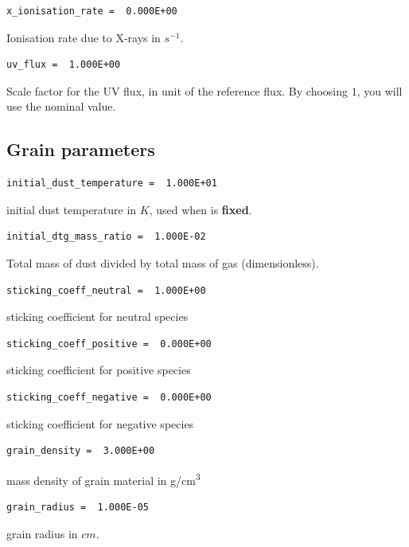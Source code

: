 \documentclass[english,a4paper,twoside]{article}
\begin{document}
\begin{verbatim}
x_ionisation_rate =  0.000E+00
\end{verbatim}
Ionisation rate due to X-rays in $\unit{s^{-1}}$.

\begin{verbatim}
uv_flux =  1.000E+00
\end{verbatim}
Scale factor for the UV flux, in unit of the reference flux. By choosing $1$, you will use the nominal value.

\subsection{Grain parameters}
\begin{verbatim}
initial_dust_temperature =  1.000E+01
\end{verbatim}
initial dust temperature in $\unit{K}$, used when  is \textbf{fixed}.

\begin{verbatim}
initial_dtg_mass_ratio =  1.000E-02
\end{verbatim}
Total mass of dust divided by total mass of gas (dimensionless).

\begin{verbatim}
sticking_coeff_neutral =  1.000E+00
\end{verbatim}
sticking coefficient for neutral species

\begin{verbatim}
sticking_coeff_positive =  0.000E+00
\end{verbatim}
sticking coefficient for positive species

\begin{verbatim}
sticking_coeff_negative =  0.000E+00
\end{verbatim}
sticking coefficient for negative species

\begin{verbatim}
grain_density =  3.000E+00
\end{verbatim}
mass density of grain material in \unit{g/cm^3}

\begin{verbatim}
grain_radius =  1.000E-05
\end{verbatim}
grain radius in $\unit{cm}$.
\end{document}
